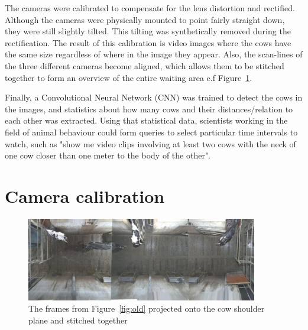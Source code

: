 \documentclass{cta-author}
\begin{document}
The cameras were calibrated to compensate for the lens distortion and rectified. Although the cameras were
physically mounted to point fairly straight down, they were still slightly tilted. This tilting was
synthetically removed during the rectification. The result of this calibration is video images where the cows
have the same size regardless of where in the image they appear. Also, the scan-lines of the three different
cameras become aligned, which allows them to be stitched together to form an overview of the entire waiting
area c.f Figure~\ref{fig:stitch}.

Finally, a Convolutional Neural Network (CNN)  was trained to detect the cows in the images, and statistics
about how many cows and their distances/relation to each other was extracted. Using that statistical data,
scientists working in the field of animal behaviour could form queries to select particular time intervals to
watch, such as "show me video clips involving at least two cows with the neck of one cow closer than one
meter to the body of the other".


\section{Camera calibration}

\begin{figure}[t]
\begin{center}
  \includegraphics[width=0.9\textwidth]{full.jpg}
\end{center}
  \caption{The frames from Figure~\ref{fig:old} projected onto the cow shoulder plane and stitched together}
  \label{fig:stitch}
\end{figure}
\end{document}

